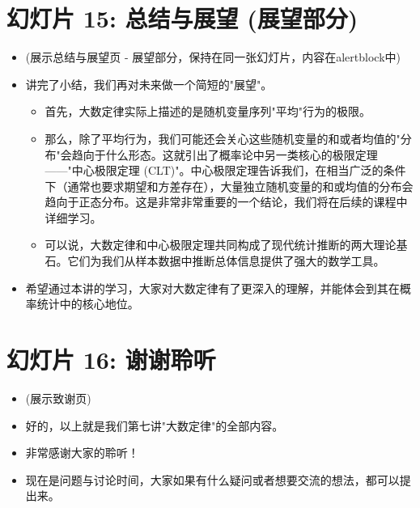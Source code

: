 \documentclass[UTF8]{article} %
\begin{document}
\section*{幻灯片 15: 总结与展望 (展望部分)}
\begin{itemize}
    \itemsep1em
    \item (展示总结与展望页 - 展望部分，保持在同一张幻灯片，内容在alertblock中)
    \item 讲完了小结，我们再对未来做一个简短的"展望"。
    \begin{itemize}[label=\textbullet, itemsep=0.5em]
        \item 首先，大数定律实际上描述的是随机变量序列"平均"行为的极限。
        \item 那么，除了平均行为，我们可能还会关心这些随机变量的和或者均值的"分布"会趋向于什么形态。这就引出了概率论中另一类核心的极限定理——"中心极限定理 (CLT)"。中心极限定理告诉我们，在相当广泛的条件下（通常也要求期望和方差存在），大量独立随机变量的和或均值的分布会趋向于正态分布。这是非常非常重要的一个结论，我们将在后续的课程中详细学习。
        \item 可以说，大数定律和中心极限定理共同构成了现代统计推断的两大理论基石。它们为我们从样本数据中推断总体信息提供了强大的数学工具。
    \end{itemize}
    \item 希望通过本讲的学习，大家对大数定律有了更深入的理解，并能体会到其在概率统计中的核心地位。
\end{itemize}

\section*{幻灯片 16: 谢谢聆听}
\begin{itemize}
    \itemsep1em
    \item (展示致谢页)
    \item 好的，以上就是我们第七讲"大数定律"的全部内容。
    \item 非常感谢大家的聆听！
    \item 现在是问题与讨论时间，大家如果有什么疑问或者想要交流的想法，都可以提出来。
\end{itemize}
\end{document}
